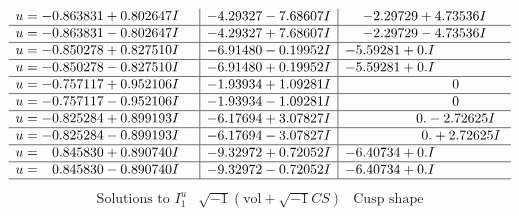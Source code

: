 \documentclass[1p]{elsarticle_modified}
\theoremstyle{definition}
\newcommand{\I}{\sqrt{-1}}
\begin{document}
$$\begin{array}{c|c|c}
\begin{aligned}
u &= -0.863831 + 0.802647 I\end{aligned}
 & -4.29327 - 7.68607 I & -2.29729 + 4.73536 I \\ \hline\begin{aligned}
u &= -0.863831 - 0.802647 I\end{aligned}
 & -4.29327 + 7.68607 I & -2.29729 - 4.73536 I \\ \hline\begin{aligned}
u &= -0.850278 + 0.827510 I\end{aligned}
 & -6.91480 - 0.19952 I & -5.59281 + 0. I\phantom{ +0.000000I} \\ \hline\begin{aligned}
u &= -0.850278 - 0.827510 I\end{aligned}
 & -6.91480 + 0.19952 I & -5.59281 + 0. I\phantom{ +0.000000I} \\ \hline\begin{aligned}
u &= -0.757117 + 0.952106 I\end{aligned}
 & -1.93934 + 1.09281 I & \phantom{-0.000000 } 0 \\ \hline\begin{aligned}
u &= -0.757117 - 0.952106 I\end{aligned}
 & -1.93934 - 1.09281 I & \phantom{-0.000000 } 0 \\ \hline\begin{aligned}
u &= -0.825284 + 0.899193 I\end{aligned}
 & -6.17694 + 3.07827 I & \phantom{-0.000000 } 0. - 2.72625 I \\ \hline\begin{aligned}
u &= -0.825284 - 0.899193 I\end{aligned}
 & -6.17694 - 3.07827 I & \phantom{-0.000000 -}0. + 2.72625 I \\ \hline\begin{aligned}
u &= \phantom{-}0.845830 + 0.890740 I\end{aligned}
 & -9.32972 + 0.72052 I & -6.40734 + 0. I\phantom{ +0.000000I} \\ \hline\begin{aligned}
u &= \phantom{-}0.845830 - 0.890740 I\end{aligned}
 & -9.32972 - 0.72052 I & -6.40734 + 0. I\phantom{ +0.000000I}\\
 \hline 
 \end{array}$$\newpage$$\begin{array}{c|c|c}  
\text{Solutions to }I^u_{1}& \I (\text{vol} + \sqrt{-1}CS) & \text{Cusp shape}\\

\end{array}$$
\end{document}
